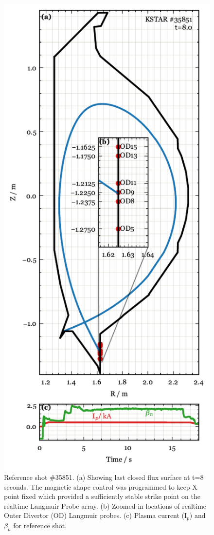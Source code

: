 \begin{figure}[!ht]
 \centering
 \includegraphics[width=\linewidth]{figures/RefShot_35851.pdf}
 \caption{
Reference shot \#35851.
(a) Showing last closed flux surface at t=8 seconds.
The magnetic shape control was programmed to keep X point fixed which provided a sufficiently stable strike point on the realtime Langmuir Probe array.
(b) Zoomed-in locations of realtime Outer Divertor (OD) Langmuir probes.
(c) Plasma current (I$_p$) and $\beta_n$ for reference shot.
}
 \label{fig:ref_shot}
\end{figure}
